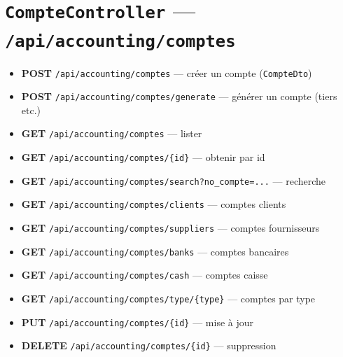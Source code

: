 \section{\texttt{CompteController} --- \texttt{/api/accounting/comptes}}
\begin{itemize}
  \item \textbf{POST} \texttt{/api/accounting/comptes} --- créer un compte (\texttt{CompteDto})
  \item \textbf{POST} \texttt{/api/accounting/comptes/generate} --- générer un compte (tiers etc.)
  \item \textbf{GET} \texttt{/api/accounting/comptes} --- lister
  \item \textbf{GET} \texttt{/api/accounting/comptes/\{id\}} --- obtenir par id
  \item \textbf{GET} \texttt{/api/accounting/comptes/search?no\_compte=...} --- recherche
  \item \textbf{GET} \texttt{/api/accounting/comptes/clients} --- comptes clients
  \item \textbf{GET} \texttt{/api/accounting/comptes/suppliers} --- comptes fournisseurs
  \item \textbf{GET} \texttt{/api/accounting/comptes/banks} --- comptes bancaires
  \item \textbf{GET} \texttt{/api/accounting/comptes/cash} --- comptes caisse
  \item \textbf{GET} \texttt{/api/accounting/comptes/type/\{type\}} --- comptes par type
  \item \textbf{PUT} \texttt{/api/accounting/comptes/\{id\}} --- mise à jour
  \item \textbf{DELETE} \texttt{/api/accounting/comptes/\{id\}} --- suppression
\end{itemize}

